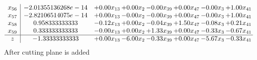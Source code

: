 \documentclass[8pt]{article}
\begin{document}
\[\begin{array}{c| c c@{\hskip 2pt} c@{\hskip 2pt} c@{\hskip 2pt} c@{\hskip 2pt} c@{\hskip 2pt} c@{\hskip 2pt} }
 x_{56}   &  -2.01355136268e-14 & +  0.00 x_{13} & +  0.00 x_{2} & -0.00 x_{39} & +  0.00 x_{47} & -0.00 x_{3} & +  1.00 x_{41}\\
 x_{57}   &  -2.82106514075e-14 & +  0.00 x_{13} & -0.00 x_{2} & -0.00 x_{39} & +  0.00 x_{47} & -0.00 x_{3} & +  1.00 x_{41}\\
 x_{58}   &  0.958333333333 & -0.12 x_{13} & +  0.00 x_{2} & -0.04 x_{39} & +  1.50 x_{47} & -0.08 x_{3} & +  0.21 x_{41}\\
 x_{59}   &  0.333333333333 & -0.00 x_{13} & +  0.00 x_{2} & +  1.33 x_{39} & +  0.00 x_{47} & -0.33 x_{3} & -0.67 x_{41}\\
\hline
z    &  -1.33333333333 & +  0.00 x_{13} & -6.00 x_{2} & -0.33 x_{39} & +  0.00 x_{47} & -5.67 x_{3} & -0.33 x_{41}\\
\end{array}\]
 After cutting plane is added 
\end{document}
